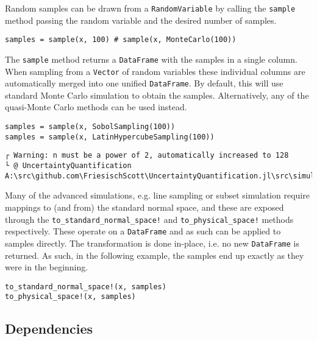 Random samples can be drawn from a \texttt{RandomVariable} by calling the \texttt{sample} method passing the random variable and the desired number of samples.




\begin{verbatim}
samples = sample(x, 100) # sample(x, MonteCarlo(100))
\end{verbatim}



The \texttt{sample} method returns a \texttt{DataFrame} with the samples in a single column. When sampling from a \texttt{Vector} of random variables these individual columns are automatically merged into one unified \texttt{DataFrame}. By default, this will use standard Monte Carlo simulation to obtain the samples. Alternatively, any of the quasi-Monte Carlo methods can be used instead.




\begin{verbatim}
samples = sample(x, SobolSampling(100))
samples = sample(x, LatinHypercubeSampling(100))
\end{verbatim}


\begin{verbatim}
┌ Warning: n must be a power of 2, automatically increased to 128
└ @ UncertaintyQuantification A:\src\github.com\FriesischScott\UncertaintyQuantification.jl\src\simulations\montecarlo.jl:16
\end{verbatim}



Many of the advanced simulations, e.g. line sampling or subset simulation require mappings to (and from) the standard normal space, and these are exposed through the \texttt{to\_standard\_normal\_space!} and \texttt{to\_physical\_space!} methods respectively. These operate on a \texttt{DataFrame} and as such can be applied to samples directly. The transformation is done in-place, i.e. no new \texttt{DataFrame} is returned. As such, in the following example, the samples end up exactly as they were in the beginning.




\begin{verbatim}
to_standard_normal_space!(x, samples)
to_physical_space!(x, samples)
\end{verbatim}



\subsection{Dependencies}



